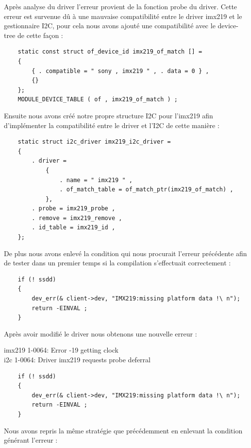 {Après analyse du driver l’erreur provient de la fonction probe du driver. Cette erreur est
survenue dû à une mauvaise compatibilité entre le driver imx219 et le gestionnaire I2C,
pour cela nous avons ajouté une compatibilité avec le device-tree de cette façon :

\begin{lstlisting}
    static const struct of_device_id imx219_of_match [] =
    {
        { . compatible = " sony , imx219 " , . data = 0 } ,
        {}
    };
    MODULE_DEVICE_TABLE ( of , imx219_of_match ) ;
\end{lstlisting}

Ensuite nous avons créé notre propre structure I2C pour l’imx219 afin d’implémenter la
compatibilité entre le driver et l’I2C de cette manière :

\begin{lstlisting}
    static struct i2c_driver imx219_i2c_driver =
    {
        . driver =
            {
                . name = " imx219 " ,
                . of_match_table = of_match_ptr(imx219_of_match) ,
            },
        . probe = imx219_probe ,
        . remove = imx219_remove ,
        . id_table = imx219_id ,
    };
\end{lstlisting}

De plus nous avons enlevé la condition qui nous procurait l’erreur précédente afin de
tester dans un premier temps si la compilation s'effectuait correctement :

\begin{lstlisting}
    if (! ssdd)
    {
        dev_err(& client->dev, "IMX219:missing platform data !\ n");
        return -EINVAL ;
    }
\end{lstlisting}

Après avoir modifié le driver nous obtenons une nouvelle erreur :

\begin{tcolorbox}
    imx219 1-0064: Error -19 getting clock \\
    i2c 1-0064: Driver imx219 requests probe deferral
\end{tcolorbox}

\begin{lstlisting}
    if (! ssdd)
    {
        dev_err(& client->dev, "IMX219:missing platform data !\ n");
        return -EINVAL ;
    }
\end{lstlisting}

Nous avons repris la même stratégie que précédemment en enlevant la condition
générant l’erreur :

}
